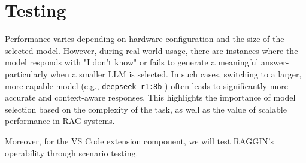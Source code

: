 \section{Testing}

Performance varies depending on hardware configuration and the size of the selected model. However, during real-world usage, there are instances where the model responds with "I don't know" or fails to generate a meaningful answer-particularly when a smaller LLM is selected. In such cases, switching to a larger, more capable model (e.g., \texttt{deepseek-r1:8b} \cite{deepseek_r1}) often leads to significantly more accurate and context-aware responses. This highlights the importance of model selection based on the complexity of the task, as well as the value of scalable performance in RAG systems.

Moreover, for the VS Code extension component, we will test RAGGIN's operability through scenario testing.

